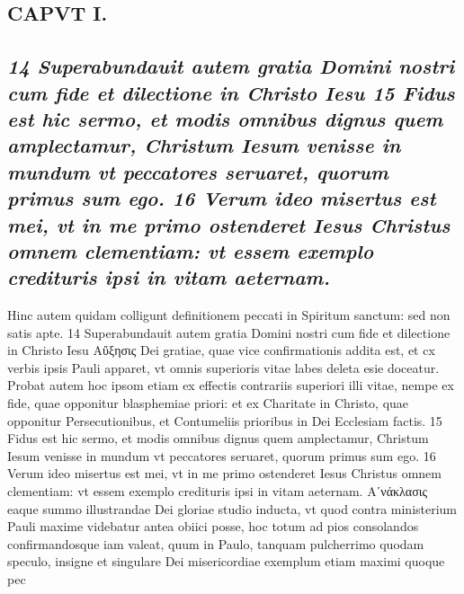 \documentclass{article}
\begin{document}
\begin{pages}
\section*{CAPVT  I. }
\marginpar{[ p.27 ]}\pstart {}
{}
\subsection*{\textit{14 Superabundauit autem gratia Domini nostri cum fide et dilectione in Christo Iesu 15 Fidus est hic sermo, et modis omnibus dignus quem amplectamur, Christum Iesum venisse in mundum vt peccatores seruaret, quorum primus sum ego. 16 Verum ideo misertus est mei, vt in me primo ostenderet Iesus Christus omnem clementiam: vt essem exemplo credituris ipsi in vitam aeternam.}}Hinc autem quidam colligunt definitionem peccati in Spiritum sanctum: sed non satis apte.  14 Superabundauit autem gratia Domini nostri cum fide et dilectione in Christo Iesu Αὔξησις Dei gratiae, quae vice confirmationis addita est, et cx verbis ipsis Pauli apparet, vt omnis superioris vitae labes deleta esie doceatur. Probat autem hoc ipsom etiam ex effectis contrariis superiori illi vitae, nempe ex fide, quae opponitur blasphemiae priori: et ex Charitate in Christo, quae opponitur Persecutionibus, et Contumeliis prioribus in Dei Ecclesiam factis. 15 Fidus est hic sermo, et modis omnibus dignus quem amplectamur, Christum Iesum venisse in mundum vt peccatores seruaret, quorum primus sum ego. 16 Verum ideo misertus est mei, vt in me primo ostenderet Iesus Christus omnem clementiam: vt essem exemplo credituris ipsi in vitam aeternam. Αʹνάκλασις eaque summo illustrandae Dei gloriae studio inducta, vt quod contra ministerium Pauli maxime videbatur antea obiici posse, hoc totum ad pios consolandos confirmandosque iam valeat, quum in Paulo, tanquam pulcherrimo quodam speculo, insigne et singulare Dei misericordiae exemplum etiam maximi quoque pec\pend

\end{pages}
\end{document}
